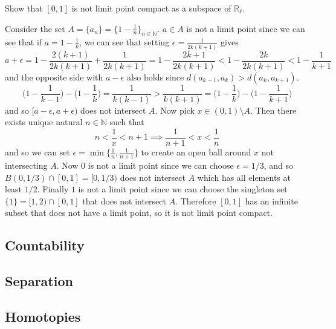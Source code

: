   \begin{exercise}[Munkres 28.2]
    Show that $[0, 1]$ is not limit point compact as a subspace of $\mathbb{R}_\ell$. 
  \end{exercise}
  \begin{solution}
    Consider the set $A = \{a_n\} = \{1 - \frac{1}{n} \}_{n \in \mathbb{N}}$. $a \in A$ is not a limit point since we can see that if $a = 1 - \frac{1}{k}$, we can see that setting $\epsilon = \frac{1}{2k (k+1)}$ gives 
    \begin{equation}
      a + \epsilon = 1 - \frac{2(k+1)}{2k(k+1)} + \frac{1}{2k (k+1)} = 1 - \frac{2k + 1}{2k(k+1)} < 1 - \frac{2k}{2k(k+1)} < 1 - \frac{1}{k+1} 
    \end{equation}
    and the opposite side with $a - \epsilon$ also holds since $d(a_{k-1}, a_k) > d(a_k, a_{k+1})$. 
    \begin{equation}
      \bigg(1 - \frac{1}{k-1} \bigg) - \bigg(1 - \frac{1}{k} \bigg) = \frac{1}{k(k-1)} > \frac{1}{k(k+1)} = \bigg(1 - \frac{1}{k} \bigg) - \bigg(1 - \frac{1}{k+1} \bigg) 
    \end{equation}
    and so $[a - \epsilon, a + \epsilon)$ does not intersect $A$. Now pick $x \in (0, 1) \setminus A$. Then there exists unique natural $n \in \mathbb{N}$ such that 
    \begin{equation}
      n < \frac{1}{x} < n + 1 \implies \frac{1}{n+1} < x < \frac{1}{n}
    \end{equation}
    and so we can set $\epsilon = \min\{\frac{1}{n}, \frac{1}{n+1}\}$ to create an open ball around $x$ not intersecting $A$. Now $0$ is not a limit point since we can choose $\epsilon = 1/3$, and so $B(0, 1/3) \cap [0, 1] = [0, 1/3)$ does not intersect $A$ which has all elements at least $1/2$. Finally $1$ is not a limit point since we can choose the singleton set $\{1\} = [1, 2) \cap [0, 1]$ that does not intersect $A$. Therefore $[0, 1]$ has an infinite subset that does not have a limit point, so it is not limit point compact. 
  \end{solution}

\subsection{Countability}

\subsection{Separation} 

\subsection{Homotopies}

